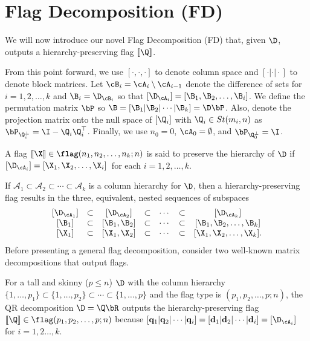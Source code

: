 
\section{Flag Decomposition (FD)}\label{sec:methods}
We will now introduce our novel Flag Decomposition (FD) that, given $\D$, outputs a hierarchy-preserving flag $[\![\Q]\!]$. 

From this point forward, we use $[\cdot,\cdot,\cdot]$ to denote column space and $[\cdot|\cdot|\cdot]$ to denote block matrices. Let $\cB_i = \cA_i \setminus \cA_{i-1}$ denote the difference of sets for $i=1,2,\dots, k$ and $\B_i = \D_{\cB_i}$ so that $[\D_{\cA_i}] = [\B_1,\B_2,\dots,\B_i]$. We define the permutation matrix $\bP$ so $\B = [\B_1|\B_2| \cdots | \B_k] = \D\bP$. Also, denote the projection matrix onto the null space of $[\Q_i]$ with $\Q_i \in St(m_i,n)$ as $\bP_{\Q_i^\perp} = \I - \Q_i\Q_i^\top$. Finally, we use $n_0 = 0$, $\cA_0 = \emptyset$, and $\bP_{\Q_0^\perp} = \I$. 



\begin{dfn}
     A flag $[\![\X]\!] \in \flag(n_1,n_2,\dots, n_k;n)$ is said to preserve the hierarchy of $\D$ if $[\D_{\cA_i}] = [\X_1,\X_2,\dots,\X_i]\,$ for each $i=1,2,\dots,k$. 
\end{dfn}

If $\mathcal{A}_1 \subset \mathcal{A}_2 \subset \cdots \subset \mathcal{A}_k$ is a column hierarchy for $\D$, then a hierarchy-preserving flag results in the three, equivalent, nested sequences of subspaces
\begin{equation*}
    \begin{matrix}
        [\D_{\cA_1}] & \subset & [\D_{\cA_2}] & \subset & \cdots & \subset & [\D_{\cA_k}]\\    
        [\B_1] & \subset & [\B_1,\B_2] & \subset & \cdots & \subset & [\B_1,\B_2, \dots,\B_k]\\
        [\X_1] & \subset & [\X_1,\X_2] & \subset & \cdots & \subset & [\X_1,\X_2,\dots,\X_k].
    \end{matrix}
\end{equation*}
Before presenting a general flag decomposition, consider two well-known matrix decompositions that output flags.
\begin{exmp}[QR decomposition]
    For a tall and skinny ($p \leq n$) $\D$ with the column hierarchy $\{1,\dots,p_1\}\subset \{1,\dots,p_2\} \subset \cdots \subset \{1,\dots,p\}$ and the flag type is $(p_1,p_2,\dots,p;n)$, the QR decomposition $\D = \Q \bR$ outputs the hierarchy-preserving flag $[\![\Q]\!] \in \flag(p_1,p_2,\dots,p;n)$ because $[\mathbf{q}_1 | \mathbf{q}_2|\cdots |\mathbf{q}_i] = [\mathbf{d}_1 | \mathbf{d}_2|\cdots |\mathbf{d}_i]=[\D_{\cA_i}]$ for $i=1,2\dots,k$.
\end{exmp}

